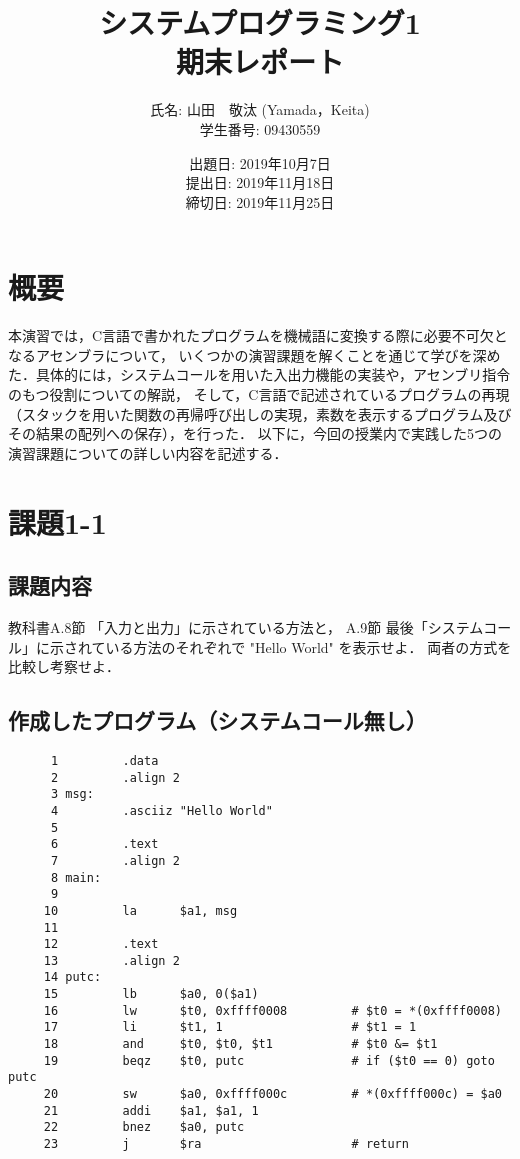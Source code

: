 \documentclass[a4j,11pt]{jarticle}
\title{システムプログラミング1 \\
       期末レポート}
\author{氏名: 山田　敬汰 (Yamada，Keita) \\
        学生番号: 09430559}
\date{出題日: 2019年10月7日 \\   %
      提出日: 2019年11月18日 \\
      締切日: 2019年11月25日 \\}  %
\begin{document}
\maketitle


\section{概要}

本演習では，C言語で書かれたプログラムを機械語に変換する際に必要不可欠となるアセンブラについて，
いくつかの演習課題を解くことを通じて学びを深めた．具体的には，システムコールを用いた入出力機能の実装や，アセンブリ指令のもつ役割についての解説，
そして，C言語で記述されているプログラムの再現（スタックを用いた関数の再帰呼び出しの実現，素数を表示するプログラム及びその結果の配列への保存），を行った．
以下に，今回の授業内で実践した5つの演習課題についての詳しい内容を記述する．

\section{課題1-1}

\subsection{課題内容}
教科書A.8節 「入力と出力」に示されている方法と， 
A.9節 最後「システムコール」に示されている方法のそれぞれで "Hello World" を表示せよ．
両者の方式を比較し考察せよ．

\subsection{作成したプログラム（システムコール無し）}

\begin{verbatim}
      1	        .data
      2	        .align 2
      3	msg:
      4	        .asciiz "Hello World"
      5	
      6	        .text
      7	        .align 2      
      8	main:
      9	        
     10	        la      $a1, msg
     11	        
     12	        .text
     13	        .align 2  
     14	putc:
     15	        lb      $a0, 0($a1)             
     16	        lw      $t0, 0xffff0008         # $t0 = *(0xffff0008)
     17	        li      $t1, 1                  # $t1 = 1
     18	        and     $t0, $t0, $t1           # $t0 &= $t1
     19	        beqz    $t0, putc               # if ($t0 == 0) goto putc
     20	        sw      $a0, 0xffff000c         # *(0xffff000c) = $a0
     21	        addi    $a1, $a1, 1
     22	        bnez    $a0, putc
     23	        j       $ra                     # return
 
\end{verbatim}
\end{document}
